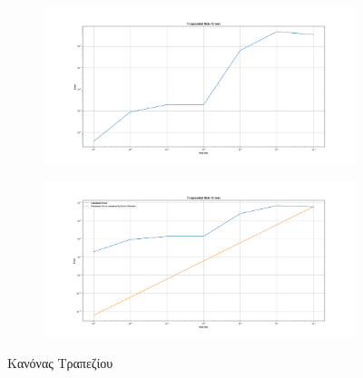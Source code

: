 \documentclass{article}
\begin{document}
\vspace*{\fill}
\begin{figure}[H]	
	\begin{adjustbox}{center}
		\begin{subfigure}[c]{.8\textwidth}    
			\includegraphics[width=1\textwidth,height=\textheight,keepaspectratio]{media/1/Figure_5.png}
		\end{subfigure}%

	\begin{subfigure}[c]{.8\textwidth}    
			\includegraphics[width=1\textwidth,height=\textheight,keepaspectratio]{media/1/Figure_6.png}
		\end{subfigure}%
		
	\end{adjustbox}
\caption{Κανόνας Τραπεζίου}
\label{(Trapezoidal_Rule)}
\end{figure}
\end{document}
